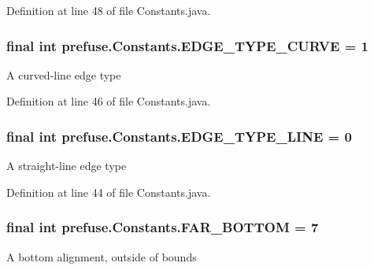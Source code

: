 \-Definition at line 48 of file \-Constants.\-java.

\hypertarget{interfaceprefuse_1_1_constants_a41f19777f0b7d810d2c7e840a63ed861}{
\subsubsection[{\-E\-D\-G\-E\-\_\-\-T\-Y\-P\-E\-\_\-\-C\-U\-R\-V\-E}]{\setlength{\rightskip}{0pt plus 5cm}final int {\bf prefuse.\-Constants.\-E\-D\-G\-E\-\_\-\-T\-Y\-P\-E\-\_\-\-C\-U\-R\-V\-E} = 1}}\label{interfaceprefuse_1_1_constants_a41f19777f0b7d810d2c7e840a63ed861}
\-A curved-\/line edge type 

\-Definition at line 46 of file \-Constants.\-java.

\hypertarget{interfaceprefuse_1_1_constants_a0b841334ca84a77ab2a3e3f9cf2aa90f}{
\subsubsection[{\-E\-D\-G\-E\-\_\-\-T\-Y\-P\-E\-\_\-\-L\-I\-N\-E}]{\setlength{\rightskip}{0pt plus 5cm}final int {\bf prefuse.\-Constants.\-E\-D\-G\-E\-\_\-\-T\-Y\-P\-E\-\_\-\-L\-I\-N\-E} = 0}}\label{interfaceprefuse_1_1_constants_a0b841334ca84a77ab2a3e3f9cf2aa90f}
\-A straight-\/line edge type 

\-Definition at line 44 of file \-Constants.\-java.

\hypertarget{interfaceprefuse_1_1_constants_ac8acbb8fec75f749bb49ac814d71d601}{
\subsubsection[{\-F\-A\-R\-\_\-\-B\-O\-T\-T\-O\-M}]{\setlength{\rightskip}{0pt plus 5cm}final int {\bf prefuse.\-Constants.\-F\-A\-R\-\_\-\-B\-O\-T\-T\-O\-M} = 7}}\label{interfaceprefuse_1_1_constants_ac8acbb8fec75f749bb49ac814d71d601}
\-A bottom alignment, outside of bounds 

